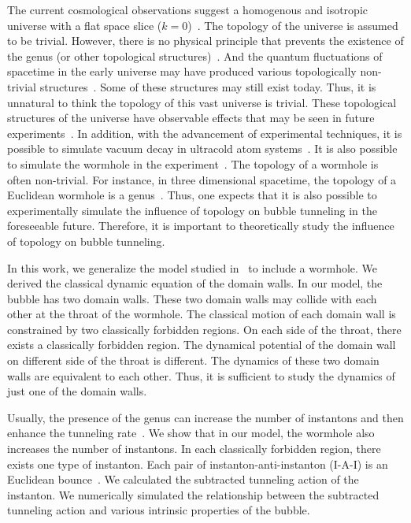 \documentclass[12pt]{article}
\begin{document}
The current cosmological observations suggest a homogenous and isotropic universe with a flat space slice ($k=0$)~\cite{SW,SD}. The topology of the universe is assumed to be trivial. However, there is no physical principle that prevents the existence of the genus (or other topological structures)~\cite{MJ}. And the quantum fluctuations of spacetime in the early universe may have produced various topologically non-trivial structures~\cite{SWH,AB}. Some of these structures may still exist today. Thus, it is unnatural to think the topology of this vast universe is trivial. These topological structures of the universe have observable effects that  may be seen in future experiments~\cite{MJ}. In addition,  with the advancement of experimental techniques, it is possible to simulate vacuum decay in ultracold atom systems~\cite{JMHAS,KBMMP}. It is also possible to simulate the wormhole in the experiment~\cite{DAJDS,C1}. The topology of a wormhole is often non-trivial. For instance, in three dimensional spacetime, the topology of a Euclidean wormhole is a genus~\cite{kb}. Thus, one expects that it is also possible to experimentally simulate the influence of topology on bubble tunneling in the foreseeable future. Therefore, it is important to theoretically study the influence of topology on bubble tunneling.

In this work,  we generalize the model studied in~\cite{EAJ} to include a wormhole.  We derived the classical dynamic equation of the domain walls.  In our model, the bubble has two domain walls. These two domain walls may collide with each other at the throat of the wormhole. The classical motion of each domain wall is constrained by two classically forbidden regions. On each side of the throat, there exists a classically forbidden region. The dynamical potential of the domain wall on different side of the throat is different.  The dynamics of these two domain walls are equivalent to each other. Thus,  it is sufficient to study the dynamics of just one of the domain walls.

Usually, the presence of the genus can increase the number of instantons and then enhance the tunneling rate~\cite{S1,L1}. We show that in our model, the wormhole also increases the number of instantons. In each classically forbidden region, there exists one type of instanton.  Each pair of instanton-anti-instanton (I-A-I) is an Euclidean bounce~\cite{SC1,SC2}. We calculated the subtracted tunneling action of the instanton. We numerically simulated the relationship between the subtracted tunneling action and various intrinsic properties of the bubble.
\end{document}
